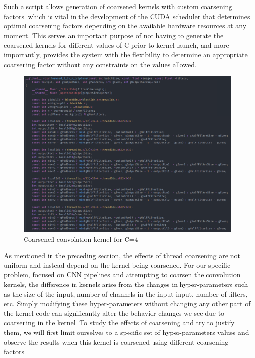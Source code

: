 Such a script allows generation of coarsened kernels with custom coarsening factors, which is vital in the development of the CUDA scheduler that determines optimal coarsening factors depending on the available hardware resources at any moment. This serves an important purpose of not having to generate the coarsened kernels for different values of C prior to kernel launch, and more importantly, provides the system with the flexibility to determine an appropriate coarsening factor without any constraints on the values allowed.

\begin{figure}[ht]
	\centering
	\includegraphics[scale=0.4]{Pictures/ch3/code coarsened.png}
	\caption{\small Coarsened convolution kernel for C=4}
\end{figure}


As mentioned in the preceding section, the effects of thread coarsening are not uniform and instead depend on the kernel being coarsened. For our specific problem, focused on CNN pipelines and attempting to coarsen the convolution kernels, the difference in kernels arise from the changes in hyper-parameters such as the size of the input, number of channels in the input input, number of filters, etc. Simply modifying these hyper-parameters without changing any other part of the kernel code can significantly alter the behavior changes we see due to coarsening in the kernel. To study the effects of coarsening and try to justify them, we will first limit ourselves to a specific set of hyper-parameters values and observe the results when this kernel is coarsened using different coarsening factors.


